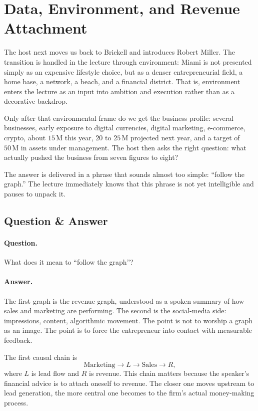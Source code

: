 \section{Data, Environment, and Revenue Attachment}

The host next moves us back to Brickell and introduces Robert Miller. The transition is handled in the lecture through environment: Miami is not presented simply as an expensive lifestyle choice, but as a denser entrepreneurial field, a home base, a network, a beach, and a financial district. That is, environment enters the lecture as an input into ambition and execution rather than as a decorative backdrop.

Only after that environmental frame do we get the business profile: several businesses, early exposure to digital currencies, digital marketing, e-commerce, crypto, about \(15\,\mathrm{M}\) this year, \(20\) to \(25\,\mathrm{M}\) projected next year, and a target of \(50\,\mathrm{M}\) in assets under management. The host then asks the right question: what actually pushed the business from seven figures to eight?

The answer is delivered in a phrase that sounds almost too simple: ``follow the graph.'' The lecture immediately knows that this phrase is not yet intelligible and pauses to unpack it.

\subsection{Question \& Answer}

\paragraph{Question.}
What does it mean to ``follow the graph''?

\paragraph{Answer.}
The first graph is the revenue graph, understood as a spoken summary of how sales and marketing are performing. The second is the social-media side: impressions, content, algorithmic movement. The point is not to worship a graph as an image. The point is to force the entrepreneur into contact with measurable feedback.

The first causal chain is
\begin{equation}
\text{Marketing} \rightarrow L \rightarrow \text{Sales} \rightarrow R,
\end{equation}
where \(L\) is lead flow and \(R\) is revenue. This chain matters because the speaker's financial advice is to attach oneself to revenue. The closer one moves upstream to lead generation, the more central one becomes to the firm's actual money-making process.

